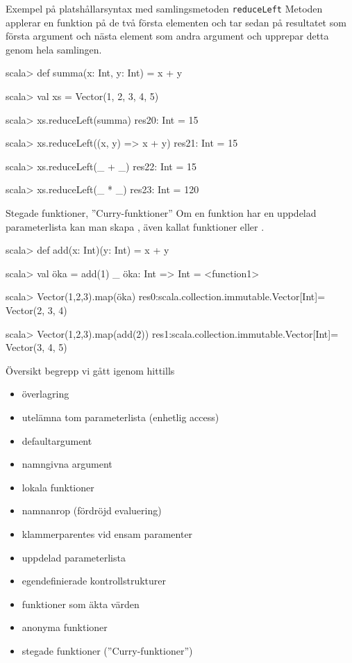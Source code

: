 \begin{Slide}{Exempel på platshållarsyntax med samlingsmetoden \texttt{reduceLeft}}\SlideFontSmall
Metoden  applerar en funktion på de två första elementen och tar sedan på resultatet som första argument och nästa element som andra argument och upprepar detta genom hela samlingen.
\begin{REPL}
scala> def summa(x: Int, y: Int) = x + y

scala> val xs = Vector(1, 2, 3, 4, 5)

scala> xs.reduceLeft(summa)
res20: Int = 15

scala> xs.reduceLeft((x, y) => x + y)
res21: Int = 15

scala> xs.reduceLeft(_ + _)
res22: Int = 15

scala> xs.reduceLeft(_ * _)
res23: Int = 120
\end{REPL}
\end{Slide}


\begin{Slide}{Stegade funktioner, ''Curry-funktioner''}
Om en funktion har en uppdelad parameterlista kan man skapa , även kallat  funktioner  eller .
\begin{REPLnonum}
scala> def add(x: Int)(y: Int) = x + y

scala> val öka = add(1) _
öka: Int => Int = <function1>

scala> Vector(1,2,3).map(öka)
res0:scala.collection.immutable.Vector[Int]= Vector(2, 3, 4)

scala> Vector(1,2,3).map(add(2))
res1:scala.collection.immutable.Vector[Int]= Vector(3, 4, 5)
\end{REPLnonum}
\end{Slide}

\begin{Slide}{Översikt begrepp vi gått igenom hittills}
\begin{itemize}
\item överlagring
\item utelämna tom parameterlista (enhetlig access)
\item defaultargument
\item namngivna argument
\item lokala funktioner
\item namnanrop (fördröjd evaluering)
\item klammerparentes vid ensam paramenter
\item uppdelad parameterlista
\item egendefinierade kontrollstrukturer
\item funktioner som äkta värden
\item anonyma funktioner
\item stegade funktioner (''Curry-funktioner'')
\end{itemize}
\end{Slide}

